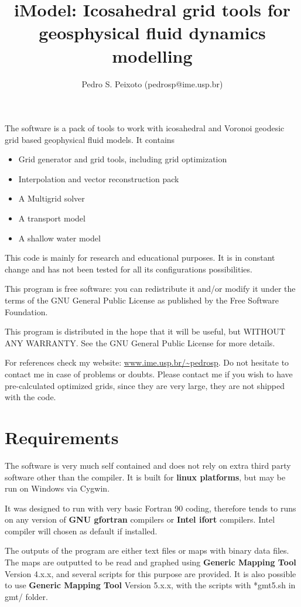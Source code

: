 \documentclass[a4paper,10pt]{article}
\title{iModel: Icosahedral grid tools for geosphysical fluid dynamics modelling}
\author{Pedro S. Peixoto (pedrosp@ime.usp.br)}
\begin{document}
\maketitle

The software is a pack of tools to work with icosahedral and Voronoi geodesic grid based geophysical fluid models. It contains
\begin{itemize}
 \item Grid generator and grid tools, including grid optimization
 \item Interpolation and vector reconstruction pack
  \item A Multigrid solver
 \item A transport model
 \item A shallow water model 
\end{itemize}



This code is mainly for research and educational purposes. It is in constant change and has not been tested for all its configurations possibilities. 

    This program is free software: you can redistribute it and/or modify
    it under the terms of the GNU General Public License as published by
    the Free Software Foundation.

    This program is distributed in the hope that it will be useful,
    but WITHOUT ANY WARRANTY. See the GNU General Public License for more details.


For references check my website: \url{www.ime.usp.br/~pedrosp}. Do not hesitate to contact me in case of problems or doubts. Please contact me if you wish to have pre-calculated optimized grids, since they are very large, they are not shipped with the code.


\section{Requirements}

The software is very much self contained and does not rely on extra third party software other than the compiler. It is built for \textbf{linux platforms}, but may be run on Windows via Cygwin.

It was designed to run with very basic Fortran 90 coding, therefore tends to runs on any version of \textbf{GNU gfortran} compilers or \textbf{Intel ifort} compilers. Intel compiler will chosen as default if installed.

The outputs of the program are either text files or maps with binary data files. The maps are outputted to be read and graphed using \textbf{Generic Mapping Tool} Version 4.x.x, and several scripts for this purpose are provided. It is also possible to use \textbf{Generic Mapping Tool} Version 5.x.x, with the scripts with *gmt5.sh in gmt/ folder.
\end{document}
